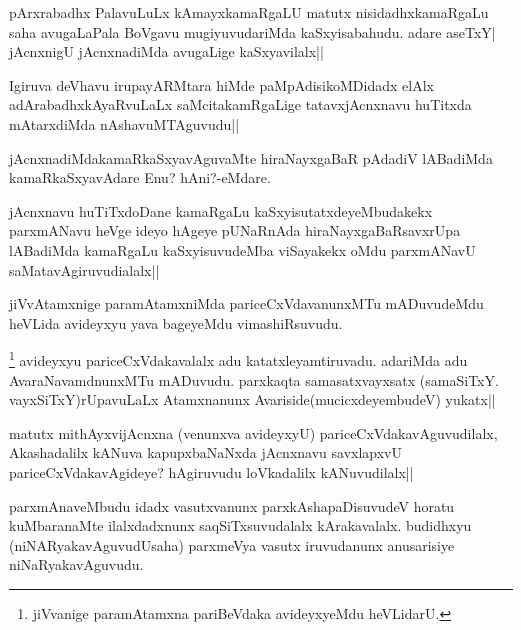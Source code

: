 \begin{artha}
pArxrabadhx PalavuLuLx kAmayxkamaRgaLU matutx nisidadhxkamaRgaLu saha avugaLaPala BoVgavu mugiyuvudariMda kaSxyisabahudu. adare aseTxY| jAcnxnigU jAcnxnadiMda avugaLige kaSxyavilalx||
\end{artha}

\begin{artha}
Igiruva deVhavu irupayARMtara hiMde paMpAdisikoMDidadx elAlx adArabadhxkAyaRvuLaLx saMcitakamRgaLige tatavxjAcnxnavu huTitxda mAtarxdiMda nAshavuMTAguvudu||
\end{artha}

\begin{artha}
jAcnxnadiMdakamaRkaSxyavAguvaMte hiraNayxgaBaR pAdadiV lABadiMda kamaRkaSxyavAdare Enu? hAni?-eMdare.
\end{artha}


\begin{artha}
jAcnxnavu huTiTxdoDane kamaRgaLu kaSxyisutatxdeyeMbudakekx parxmANavu heVge ideyo hAgeye pUNaRnAda hiraNayxgaBaRsavxrUpa lABadiMda kamaRgaLu kaSxyisuvudeMba viSayakekx oMdu parxmANavU saMatavAgiruvudialalx||
\end{artha}

\begin{artha}
jiVvAtamxnige paramAtamxniMda pariceCxVdavanunxMTu mADuvudeMdu heVLida avideyxyu yava bageyeMdu vimashiRsuvudu.
\end{artha}



\begin{artha}
\footnote[1]{jiVvanige paramAtamxna pariBeVdaka avideyxyeMdu heVLidarU.} avideyxyu pariceCxVdakavalalx adu katatxleyamtiruvadu. adariMda adu AvaraNavamdnunxMTu mADuvudu. parxkaqta samasatxvayxsatx (samaSiTxY. vayxSiTxY)rUpavuLaLx Atamxnanunx Avariside(mucicxdeyembudeV) yukatx||
\end{artha}

\begin{artha}
matutx mithAyxvijAcnxna (venunxva avideyxyU) pariceCxVdakavAguvudilalx, Akashadalilx 
kANuva kapupxbaNaNxda jAcnxnavu savxlapxvU pariceCxVdakavAgideye? hAgiruvudu loVkadalilx 
kANuvudilalx||
\end{artha}

\begin{artha}
parxmAnaveMbudu idadx vasutxvanunx parxkAshapaDisuvudeV horatu kuMbaranaMte ilalxdadxnunx 
saqSiTxsuvudalalx kArakavalalx. budidhxyu (niNARyakavAguvudUsaha) parxmeVya vasutx 
iruvudanunx anusarisiye niNaRyakavAguvudu.
\end{artha}

